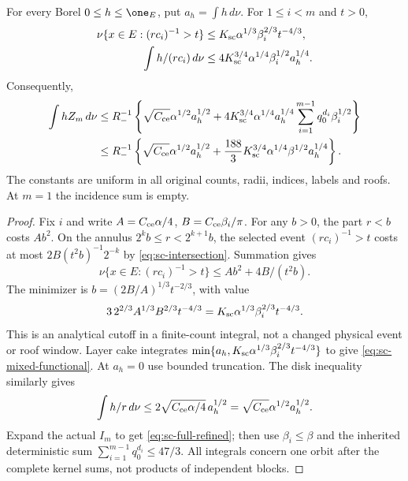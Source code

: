 \begin{theorem}
\label{thm:sc-multiplier}
For every Borel $0\le h\le\one_E$, put $a_h=\int h\,d\nu$.
For $1\le i<m$ and $t>0$,
\begin{align}
 \nu\{x\in E:(rc_i)^{-1}>t\}
 &\le K_{\rm sc}\alpha^{1/3}\beta_i^{2/3}t^{-4/3},
                                             \label{eq:sc-mixed-tail}\\
 \int h/(rc_i)\,d\nu
 &\le4K_{\rm sc}^{3/4}\alpha^{1/4}\beta_i^{1/2}a_h^{1/4}.
                                       \label{eq:sc-mixed-functional}
\end{align}
Consequently,
\begin{align}
 \int hZ_m\,d\nu
 &\le R_-^{-1}\left\{\sqrt{C_{\rm ce}}\alpha^{1/2}a_h^{1/2}
 +4K_{\rm sc}^{3/4}\alpha^{1/4}a_h^{1/4}
                  \sum_{i=1}^{m-1}q_0^{d_i}\beta_i^{1/2}\right\}
                                            \label{eq:sc-full-refined}\\
 &\le R_-^{-1}\left\{\sqrt{C_{\rm ce}}\alpha^{1/2}a_h^{1/2}
 +\frac{188}{3}K_{\rm sc}^{3/4}
                       \alpha^{1/4}\beta^{1/2}a_h^{1/4}\right\}.
                                                     \label{eq:sc-full}
\end{align}
The constants are uniform in all original counts, radii, indices,
labels and roofs.  At $m=1$ the incidence sum is empty.
\end{theorem}
\begin{proof}
Fix $i$ and write $A=C_{\rm ce}\alpha/4$,
$B=C_{\rm ce}\beta_i/\pi$.  For any $b>0$, the part $r<b$ costs
$Ab^2$.  On the annulus $2^kb\le r<2^{k+1}b$, the selected event
$(rc_i)^{-1}>t$ costs at most $2B(t^2b)^{-1}2^{-k}$ by
\eqref{eq:sc-intersection}.  Summation gives
\[
 \nu\{x\in E:(rc_i)^{-1}>t\}\le Ab^2+4B/(t^2b).
\]
The minimizer is $b=(2B/A)^{1/3}t^{-2/3}$, with value
\[
 3\,2^{2/3}A^{1/3}B^{2/3}t^{-4/3}
      =K_{\rm sc}\alpha^{1/3}\beta_i^{2/3}t^{-4/3}.
\]
This is an analytical cutoff in a finite-count integral, not a
changed physical event or roof window.  Layer cake integrates
$\min\{a_h,K_{\rm sc}\alpha^{1/3}\beta_i^{2/3}t^{-4/3}\}$
to give \eqref{eq:sc-mixed-functional}.  At $a_h=0$ use bounded
truncation.  The disk inequality similarly gives
\[
 \int h/r\,d\nu
 \le2\sqrt{C_{\rm ce}\alpha/4}\,a_h^{1/2}
 =\sqrt{C_{\rm ce}}\alpha^{1/2}a_h^{1/2}.
\]
Expand the actual $I_m$ to get \eqref{eq:sc-full-refined}; then use
$\beta_i\le\beta$ and the inherited deterministic sum
$\sum_{i=1}^{m-1}q_0^{d_i}\le47/3$.  All integrals concern one orbit
after the complete kernel sums, not products of independent blocks.
\end{proof}

